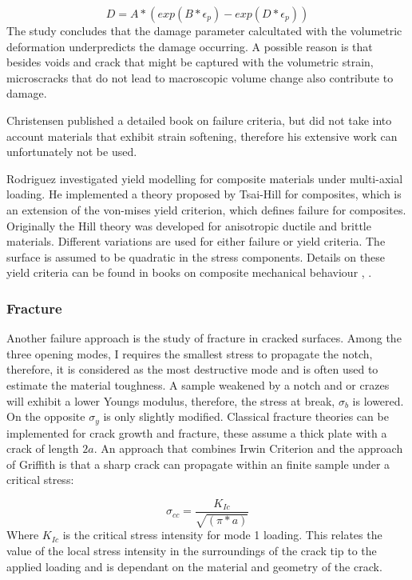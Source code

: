 \begin{equation}\label{AzziTsai}
D=A*(exp(B*\epsilon_p)-exp(D*\epsilon_p))
\end{equation}The study concludes that the damage parameter calcultated with the volumetric deformation underpredicts the damage occurring. A possible reason is that besides voids and crack that might be captured with the volumetric strain, microscracks that do not lead to macroscopic volume change also contribute to damage. 

Christensen \cite{Christensen2013TheFailure}  published a detailed book on failure criteria, but did not take into account materials that exhibit strain softening, therefore his extensive work can unfortunately not be used. 

Rodriguez \cite{Rodriguez2003MechanicalModeling} investigated yield modelling for composite materials under multi-axial loading. He implemented a theory proposed by Tsai-Hill for composites, which is an extension of the von-mises yield criterion, which defines failure for composites. Originally the Hill theory was developed for anisotropic ductile and brittle materials. Different variations are used for either failure or yield criteria. The  surface is assumed to be quadratic in the stress components. Details on these yield criteria can be found in books on composite mechanical behaviour \cite{Daniel2006EngineeringMaterials}, \cite{Mallick2007Fiber-Composites}.

\subsubsection{Fracture}
Another failure approach is the study of fracture in cracked surfaces. Among the three opening modes, I requires the smallest stress to propagate the notch, therefore, it is considered as the most destructive mode and is often used to estimate the material toughness. A sample weakened by a notch and or crazes will exhibit a lower Youngs modulus, therefore, the stress at break, $\sigma_b$ is lowered. On the opposite $\sigma_y$ is only slightly modified. Classical fracture theories can be implemented for crack growth and fracture, these assume a thick plate with a crack of length $2a$. An approach that combines Irwin Criterion and  the approach of Griffith is that a sharp crack can propagate within an finite sample under a critical stress:

\begin{equation} \label{eqn:criticalstress}
 \sigma_{cc}=\frac{K_{Ic}}{\sqrt{(\pi*a)}}
\end{equation}
Where $K_{Ic}$ is the critical stress intensity for mode 1 loading. This relates the value of the local stress intensity in the surroundings of the crack tip to the applied loading and is dependant on the material and geometry of the crack. 

